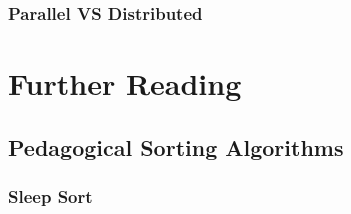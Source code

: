 \subsubsection{Parallel VS Distributed}




\section{Further Reading}

\subsection{Pedagogical Sorting Algorithms}

\subsubsection{Sleep Sort}